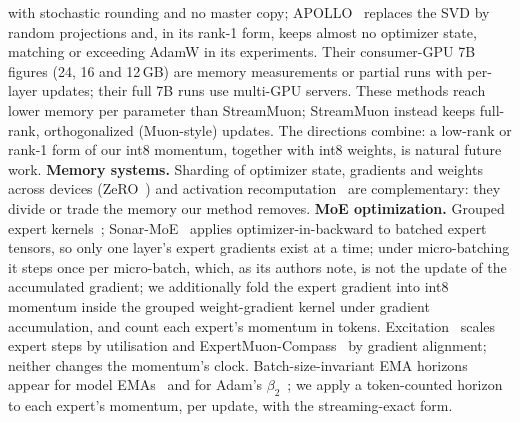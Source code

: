 \documentclass[10pt]{article}
\newcommand{\method}{StreamMuon}\newcommand{\lite}{StreamMuon-Lite}
\begin{document}
with stochastic rounding and no master copy; APOLLO~\citep{zhu2025apollo} replaces the SVD by random projections and,
in its rank-1 form, keeps almost no optimizer state, matching or exceeding AdamW in its experiments. Their
consumer-GPU 7B figures (24, 16 and 12\,GB) are memory measurements or partial runs with per-layer updates; their
full 7B runs use multi-GPU servers. These methods reach lower memory per parameter than \method; \method{} instead
keeps full-rank, orthogonalized (Muon-style) updates. The directions combine: a low-rank or rank-1 form of our int8
momentum, together with int8 weights, is natural future work.
\textbf{Memory systems.} Sharding of optimizer state, gradients and weights across devices (ZeRO~\citep{rajbhandari2020zero})
and activation recomputation~\citep{chen2016checkpoint} are complementary: they divide or trade the memory our method
removes. \textbf{MoE optimization.} Grouped expert kernels~\citep{gale2023megablocks}; Sonar-MoE~\citep{mittal2026sonarmoe} applies optimizer-in-backward to batched expert
tensors, so only one layer's expert gradients exist at a time; under micro-batching it steps once per micro-batch,
which, as its authors note, is not the update of the accumulated gradient; we additionally fold the expert gradient into int8
momentum inside the grouped weight-gradient kernel under gradient accumulation, and count each expert's momentum in
tokens. Excitation~\citep{shaier2026excitation} scales expert steps by utilisation and
ExpertMuon-Compass~\citep{vaidya2026compass} by gradient alignment; neither changes the momentum's clock. Batch-size-invariant EMA horizons appear for model EMAs~\citep{busbridge2023ema} and for Adam's
$\beta_2$~\citep{marek2025smallbatch}; we apply a token-counted horizon to each expert's momentum, per update, with the
streaming-exact form.

\end{document}
